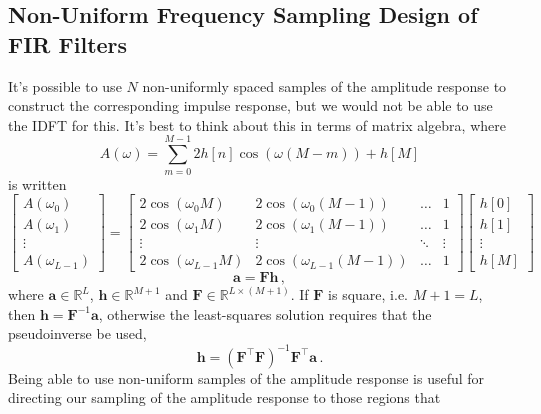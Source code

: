 \subsection{Non-Uniform Frequency Sampling Design of FIR Filters}
%
It's possible to use $N$ non-uniformly spaced samples of the
amplitude response to construct the corresponding impulse response, but we
would not be able to use the IDFT for this. It's best to think about
this in terms of matrix algebra, where
%
\begin{displaymath}
  A(\omega) = \sum_{m=0}^{M-1}2h[n]\cos(\omega(M-m)) + h[M]
\end{displaymath}
%
is written
%
\begin{displaymath}
  \left[\begin{array}{c} A(\omega_0) \\ A(\omega_1) \\ \vdots \\ A(\omega_{L-1})\end{array}\right]
  =
  \left[\begin{array}{cccc}
      2\cos(\omega_0 M) & 2\cos(\omega_0 (M-1)) & \hdots & 1 \\
      2\cos(\omega_1 M) & 2\cos(\omega_1 (M-1)) & \hdots & 1 \\
      \vdots & \vdots & \ddots & \vdots \\
      2\cos(\omega_{L-1} M) & 2\cos(\omega_{L-1} (M-1)) & \hdots & 1      
    \end{array}\right]
  \left[\begin{array}{c} h[0] \\ h[1] \\ \vdots \\ h[M]\end{array}\right]
\end{displaymath}
%
\begin{displaymath}
  \mathbf{a} = \mathbf{Fh} \,,
\end{displaymath}
%
where $\mathbf{a}\in\mathbb{R}^L$, $\mathbf{h}\in\mathbb{R}^{M+1}$ and
$\mathbf{F}\in\mathbb{R}^{L\times(M+1)}$. If $\mathbf{F}$ is square, i.e.
$M+1 = L$, then $\mathbf{h} = \mathbf{F}^{-1}\mathbf{a}$, otherwise the
least-squares solution requires that the pseudoinverse be used,
%
\begin{displaymath}
  \mathbf{h} = \left(\mathbf{F}^\top\mathbf{F}\right)^{-1}\mathbf{F}^\top\mathbf{a} \,.
\end{displaymath}
%
Being able to use non-uniform samples of the amplitude response is useful
for directing our sampling of the amplitude response to those regions that
